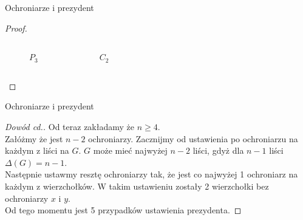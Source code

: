 \documentclass[polish]{beamer}
\begin{document}
\begin{frame}{Ochroniarze i prezydent}
\begin{proof}
\begin{examples}
\begin{columns}[t]
\begin{figure}
                        \caption{$P_3$}
                    \end{figure}    
                    \centering
                    \begin{figure}    
                        \caption{$C_2$}
                    \end{figure}    
            \end{columns}
        \end{examples}
    \end{proof}
\end{frame}

\begin{frame}{Ochroniarze i prezydent}
    \begin{proof}[Dowód cd.]
        \renewcommand{\qedsymbol}{}
        Od teraz zakładamy że $n \ge 4$.\\
        \pause
        Załóżmy że jest $n-2$ ochroniarzy. Zacznijmy od ustawienia po ochroniarzu na każdym z liści na $G$.
        $G$ może mieć najwyżej $n-2$ liści, gdyż dla $n-1$ liści $\Delta\left(G\right)=n-1$.\\
        \pause
        Następnie ustawmy resztę ochroniarzy tak, że jest co najwyżej 1 ochroniarz na każdym z wierzchołków.
        W takim ustawieniu zostały 2 wierzchołki bez ochroniarzy $x$ i $y$. \\
        \pause
        Od tego momentu jest 5 przypadków ustawienia prezydenta.
    \end{proof}
\end{frame}
\end{document}
